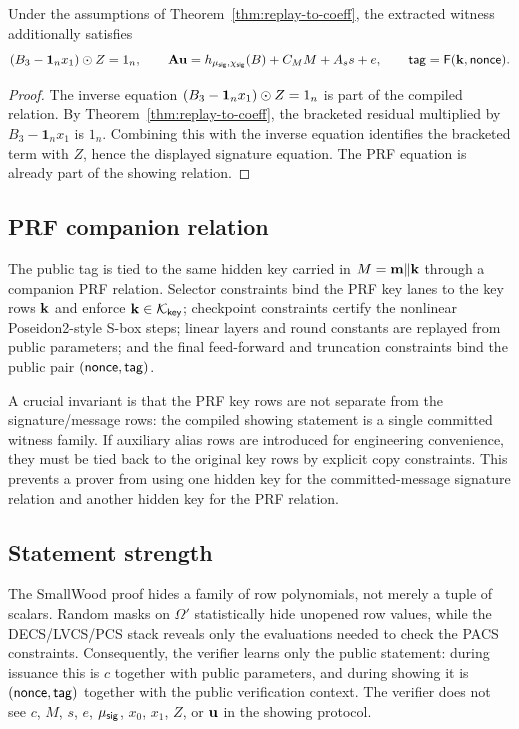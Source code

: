 \begin{corollary}\label{cor:showing-to-abstract}
Under the assumptions of Theorem~\ref{thm:replay-to-coeff}, the extracted witness additionally satisfies
\[
  (B_3-\mathbf 1_nx_1)\odot Z=1_n,
  \qquad
  \mathbf{A}\mathbf{u}=h_{\mu_{\mathsf{sig}},\chi_{\mathsf{sig}}}(B)+C_MM+A_s s+e,
  \qquad
  \mathsf{tag}=\mathsf{F}(\mathbf{k},\mathsf{nonce}).
\]
\end{corollary}

\begin{proof}
The inverse equation \((B_3-\mathbf 1_nx_1)\odot Z=1_n\) is part of the compiled relation.  By
Theorem~\ref{thm:replay-to-coeff}, the bracketed residual multiplied by \(B_3-\mathbf 1_nx_1\) is \(1_n\).  Combining
this with the inverse equation identifies the bracketed term with \(Z\), hence the displayed signature equation.  The
PRF equation is already part of the showing relation.
\end{proof}

\subsection{PRF companion relation}
\label{subsec:prf-checkpointed}
The public tag is tied to the same hidden key carried in \(M=\mathbf{m}\Vert\mathbf{k}\) through a companion PRF relation.
Selector constraints bind the PRF key lanes to the key rows \(\mathbf{k}\) and enforce
\(\mathbf{k}\in\mathcal K_{\mathsf{key}}\); checkpoint constraints certify the nonlinear Poseidon2-style S-box steps;
linear layers and round constants are replayed from public parameters; and the final feed-forward and truncation
constraints bind the public pair \((\mathsf{nonce},\mathsf{tag})\).

A crucial invariant is that the PRF key rows are not separate from the signature/message rows: the compiled showing
statement is a single committed witness family.  If auxiliary alias rows are introduced for engineering convenience,
they must be tied back to the original key rows by explicit copy constraints.  This prevents a prover from using one
hidden key for the committed-message signature relation and another hidden key for the PRF relation.

\subsection{Statement strength}
\label{subsec:statement-strength}
The SmallWood proof hides a family of row polynomials, not merely a tuple of scalars.  Random masks on \(\Omega'\)
statistically hide unopened row values, while the DECS/LVCS/PCS stack reveals only the evaluations needed to check
the PACS constraints.  Consequently, the verifier learns only the public statement: during issuance this is \(c\)
together with public parameters, and during showing it is \((\mathsf{nonce},\mathsf{tag})\) together with the public verification
context.  The verifier does not see \(c\), \(M\), \(s\), \(e\), \(\mu_{\mathsf{sig}}\), \(x_0\), \(x_1\), \(Z\), or \(\mathbf{u}\) in the
showing protocol.

